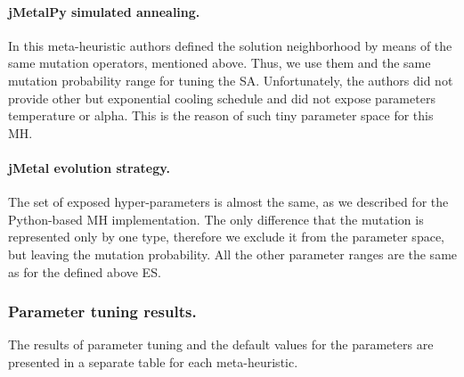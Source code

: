 \paragraph{jMetalPy simulated annealing.} In this meta-heuristic authors defined the solution neighborhood by means of the same mutation operators, mentioned above. Thus, we use them and the same mutation probability range for tuning the SA. Unfortunately, the authors did not provide other but exponential cooling schedule and did not expose parameters temperature or alpha. This is the reason of such tiny parameter space for this MH.

\paragraph{jMetal evolution strategy.} The set of exposed hyper-parameters is almost the same, as we described for the Python-based MH implementation. The only difference that the mutation is represented only by one type, therefore we exclude it from the parameter space, but leaving the mutation probability. All the other parameter ranges are the same as for the defined above ES.


\subsubsection{Parameter tuning results.} 
The results of parameter tuning and the default values for the parameters are presented in a separate table for each meta-heuristic.

